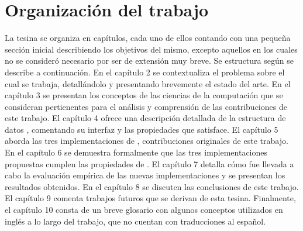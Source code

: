   \section{Organización del trabajo}
  La tesina se organiza en capítulos, cada uno de ellos contando con una pequeña sección inicial
  describiendo los objetivos del mismo, excepto aquellos en los cuales no se consideró necesario por
  ser de extensión muy breve.
  Se estructura según se describe a continuación.
  En el capítulo 2 se
  contextualiza el problema sobre el cual se trabaja, detallándolo y presentando brevemente
  el estado del arte.
  En el capítulo 3 se presentan los conceptos de las ciencias de la computación que se
  consideran pertienentes para el análisis y comprensión de las contribuciones de este trabajo.
  El capítulo 4 ofrece una descripción detallada de la estructura de datos \setchain,
  comentando su interfaz y las propiedades que satisface.
  El capítulo 5 aborda las tres implementaciones de \setchain, contribuciones originales
  de este trabajo.
  En el capítulo 6 se demuestra formalmente que las tres implementaciones propuestas
  cumplen las propiedades de \setchain.
  El capítulo 7 detalla cómo fue llevada a cabo la evaluación empírica de las nuevas implementaciones
  y se presentan los resultados obtenidos.
  En el capítulo 8 se discuten las conclusiones de este trabajo.
  El capítulo 9 comenta trabajos futuros que se derivan de esta tesina.
  Finalmente, el capítulo 10 consta de un breve glosario con algunos conceptos
  utilizados en inglés a lo largo del trabajo, que no cuentan con traducciones al español.

